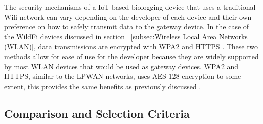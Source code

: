 \documentclass[sigplan,screen,nonacm]{acmart}
\begin{document}
The security mechanisms of a IoT based biologging device that uses a traditional Wifi network can vary 
depending on the developer of each device and their own preference on how to safely transmit data to the gateway 
device. In the case of the WildFi devices discussed in section ~\ref{subsec:Wireless Local Area Networks (WLAN)}, data 
transmissions are encrypted with WPA2 and HTTPS \cite{wild2023internet}. These two methods allow for ease of 
use for the developer because they are widely supported by most WLAN devices that would be used as gateway 
devices. WPA2 and HTTPS, similar to the LPWAN networks, uses AES 128 encryption to some extent, this provides the same 
benefits as previously discussed \cite{WPA2Moissinac}. 

\subsection{Comparison and Selection Criteria}
\label{subsec:Protocol Comparison and Selection Criteria}
\end{document}
